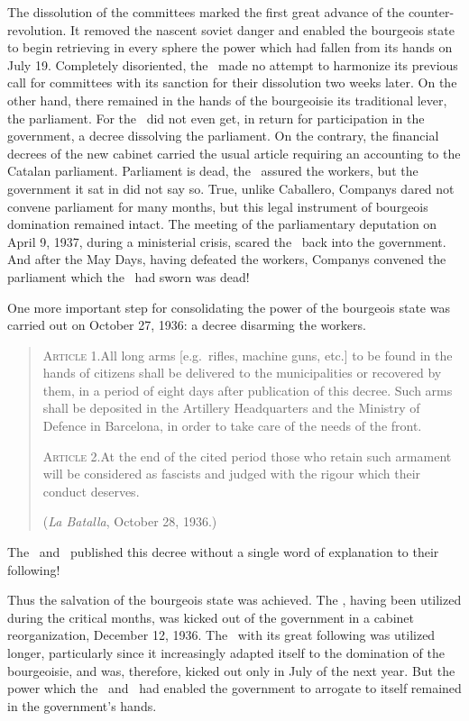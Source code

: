 The dissolution of the committees marked the first great advance of the counter-revolution. It removed the nascent soviet danger and enabled the bourgeois state to begin retrieving in every sphere the power which had fallen from its hands on July 19. Completely disoriented, the \POUM\ made no attempt to harmonize its previous call for committees with its sanction for their dissolution two weeks later. On the other hand, there remained in the hands of the bourgeoisie its traditional lever, the parliament. For the \POUM\ did not even get, in return for participation in the government, a decree dissolving the parliament. On the contrary, the financial decrees of the new cabinet carried the usual article requiring an accounting to the Catalan parliament. Parliament is dead, the \POUM\ assured the workers, but the government it sat in did not say so. True, unlike Caballero, Companys dared not convene parliament for many months, but this legal instrument of bourgeois domination remained intact. The meeting of the parliamentary deputation on April 9, 1937, during a ministerial crisis, scared the \CNT\ back into the government. And after the May Days, having defeated the workers, Companys convened the parliament which the \POUM\ had sworn was dead!

One more important step for consolidating the power of the bourgeois state was carried out on October 27, 1936: a decree disarming the workers.

\begin{quote}
  \textsc{\textsf{Article 1.}}\quad All long arms [e.g.\ rifles, machine guns, etc.] to be found in the hands of citizens shall be delivered to the municipalities or recovered by them, in a period of eight days after publication of this decree. Such arms shall be deposited in the Artillery Headquarters and the Ministry of Defence in Barcelona, in order to take care of the needs of the front.
  
  \textsc{\textsf{Article 2.}}\quad At the end of the cited period those who retain such armament will be considered as fascists and judged with the rigour which their conduct deserves.
  
  (\emph{La Batalla}, October 28, 1936.)
\end{quote}

The \POUM\ and \CNT\ published this decree without a single word of explanation to their following!

Thus the salvation of the bourgeois state was achieved. The \POUM, having been utilized during the critical months, was kicked out of the government in a cabinet reorganization, December 12, 1936. The \CNT\ with its great following was utilized longer, particularly since it increasingly adapted itself to the domination of the bourgeoisie, and was, therefore, kicked out only in July of the next year. But the power which the \POUM\ and \CNT\ had enabled the government to arrogate to itself remained in the government’s hands.

